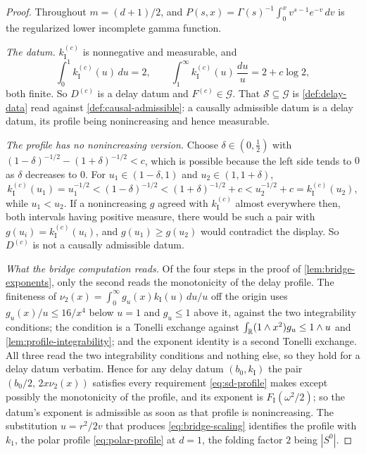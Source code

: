 \begin{proof}
Throughout $m = (d+1)/2$, and $P(s,x) = \Gamma(s)^{-1}\int_0^x v^{s-1}e^{-v}\,dv$ is the
regularized lower incomplete gamma function.

\emph{The datum.} $k^{(c)}_{\mathrm I}$ is nonnegative and measurable, and
\[
  \int_0^1 k^{(c)}_{\mathrm I}(u)\,du = 2, \qquad
  \int_1^\infty k^{(c)}_{\mathrm I}(u)\,\frac{du}{u} = 2 + c\log 2 ,
\]
both finite. So $D^{(c)}$ is a delay datum and $F^{(c)} \in \mathcal{G}$. That
$\mathcal{S} \subseteq \mathcal{G}$ is \ref{def:delay-data} read against
\ref{def:causal-admissible}: a causally admissible datum is a delay datum, its profile being
nonincreasing and hence measurable.

\emph{The profile has no nonincreasing version.} Choose $\delta \in (0,\tfrac12)$ with
$(1-\delta)^{-1/2} - (1+\delta)^{-1/2} < c$, which is possible because the left side tends to $0$
as $\delta$ decreases to $0$. For $u_1 \in (1-\delta,1)$ and $u_2 \in (1,1+\delta)$,
\[
  k^{(c)}_{\mathrm I}(u_1) = u_1^{-1/2} < (1-\delta)^{-1/2} < (1+\delta)^{-1/2} + c
   < u_2^{-1/2} + c = k^{(c)}_{\mathrm I}(u_2) ,
\]
while $u_1 < u_2$. If a nonincreasing $g$ agreed with $k^{(c)}_{\mathrm I}$ almost everywhere then,
both intervals having positive measure, there would be such a pair with
$g(u_i) = k^{(c)}_{\mathrm I}(u_i)$, and $g(u_1) \ge g(u_2)$ would contradict the display. So
$D^{(c)}$ is not a causally admissible datum.

\emph{What the bridge computation reads.} Of the four steps in the proof of
\ref{lem:bridge-exponents}, only the second reads the monotonicity of the delay profile. The
finiteness of $\nu_2(x) = \int_0^\infty g_u(x)k_{\mathrm I}(u)\,du/u$ off the origin uses
$g_u(x)/u \le 16/x^4$ below $u = 1$ and $g_u \le 1$ above it, against the two integrability
conditions; the \Levy{} condition is a Tonelli exchange against
$\int_{\mathbb{R}} (1 \wedge x^2)g_u \le 1 \wedge u$ and \ref{lem:profile-integrability}; and the exponent
identity is a second Tonelli exchange. All three read the two integrability conditions and nothing
else, so they hold for a delay datum verbatim. Hence for any delay datum $(b_0, k_{\mathrm I})$
the pair $(b_0/2,\,2x\nu_2(x))$ satisfies every requirement \ref{eq:sd-profile} makes except
possibly the monotonicity of the profile, and its exponent is $F_{\mathrm I}(\omega^2/2)$; so the
datum's exponent is admissible as soon as that profile is nonincreasing. The substitution
$u = r^2/2v$ that produces \ref{eq:bridge-scaling} identifies the profile with $k_1$, the polar
profile \ref{eq:polar-profile} at $d = 1$, the folding factor $2$ being $|S^0|$.


\end{proof}
